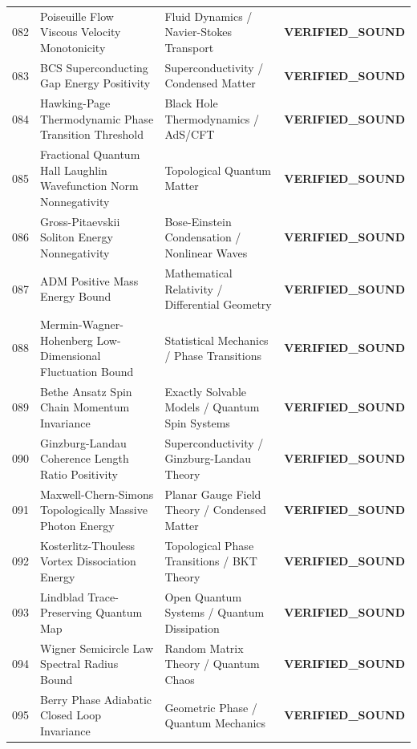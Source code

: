 \documentclass[10pt,a4paper]{article}
\begin{document}
\begin{longtable}{p{0.8cm} p{7.0cm} p{3.8cm} p{3.0cm}}
082 & Poiseuille Flow Viscous Velocity Monotonicity & Fluid Dynamics / Navier-Stokes Transport & \textcolor{green!70!black}{\textbf{VERIFIED\_SOUND}} \\
083 & BCS Superconducting Gap Energy Positivity & Superconductivity / Condensed Matter & \textcolor{green!70!black}{\textbf{VERIFIED\_SOUND}} \\
084 & Hawking-Page Thermodynamic Phase Transition Threshold & Black Hole Thermodynamics / AdS/CFT & \textcolor{green!70!black}{\textbf{VERIFIED\_SOUND}} \\
085 & Fractional Quantum Hall Laughlin Wavefunction Norm Nonnegativity & Topological Quantum Matter & \textcolor{green!70!black}{\textbf{VERIFIED\_SOUND}} \\
086 & Gross-Pitaevskii Soliton Energy Nonnegativity & Bose-Einstein Condensation / Nonlinear Waves & \textcolor{green!70!black}{\textbf{VERIFIED\_SOUND}} \\
087 & ADM Positive Mass Energy Bound & Mathematical Relativity / Differential Geometry & \textcolor{green!70!black}{\textbf{VERIFIED\_SOUND}} \\
088 & Mermin-Wagner-Hohenberg Low-Dimensional Fluctuation Bound & Statistical Mechanics / Phase Transitions & \textcolor{green!70!black}{\textbf{VERIFIED\_SOUND}} \\
089 & Bethe Ansatz Spin Chain Momentum Invariance & Exactly Solvable Models / Quantum Spin Systems & \textcolor{green!70!black}{\textbf{VERIFIED\_SOUND}} \\
090 & Ginzburg-Landau Coherence Length Ratio Positivity & Superconductivity / Ginzburg-Landau Theory & \textcolor{green!70!black}{\textbf{VERIFIED\_SOUND}} \\
091 & Maxwell-Chern-Simons Topologically Massive Photon Energy & Planar Gauge Field Theory / Condensed Matter & \textcolor{green!70!black}{\textbf{VERIFIED\_SOUND}} \\
092 & Kosterlitz-Thouless Vortex Dissociation Energy & Topological Phase Transitions / BKT Theory & \textcolor{green!70!black}{\textbf{VERIFIED\_SOUND}} \\
093 & Lindblad Trace-Preserving Quantum Map & Open Quantum Systems / Quantum Dissipation & \textcolor{green!70!black}{\textbf{VERIFIED\_SOUND}} \\
094 & Wigner Semicircle Law Spectral Radius Bound & Random Matrix Theory / Quantum Chaos & \textcolor{green!70!black}{\textbf{VERIFIED\_SOUND}} \\
095 & Berry Phase Adiabatic Closed Loop Invariance & Geometric Phase / Quantum Mechanics & \textcolor{green!70!black}{\textbf{VERIFIED\_SOUND}} \\

\end{longtable}
\end{document}

